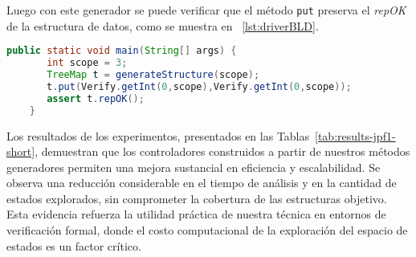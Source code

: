Luego con este generador se puede verificar que el método \texttt{put} preserva el \emph{repOK} de la estructura de datos, como se muestra en ~\ref{lst:driverBLD}.

\begin{lstlisting}[caption={Probando el método put de TreeMap con JPF},label={lst:driverBLD},language=Java,captionpos=b]
    public static void main(String[] args) {
       int scope = 3;
       TreeMap t = generateStructure(scope);
       t.put(Verify.getInt(0,scope),Verify.getInt(0,scope));
       assert t.repOK();
    }
\end{lstlisting}

Los resultados de los experimentos, presentados en las Tablas~\ref{tab:results-jpf1-short}, demuestran que los controladores construidos a partir de nuestros 
métodos generadores permiten una mejora sustancial en eficiencia y escalabilidad. Se observa una reducción considerable en el tiempo de análisis y en la cantidad de estados explorados, sin 
comprometer la cobertura de las estructuras objetivo. Esta evidencia refuerza la utilidad práctica 
de nuestra técnica en entornos de verificación formal, donde el costo computacional de la exploración 
del espacio de estados es un factor crítico.





